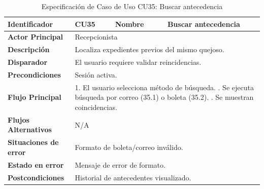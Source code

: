 \begingroup
\setlength{\parskip}{0pt}
\begin{longtable}{|p{3.5cm}|p{2cm}|p{2.5cm}|p{7cm}|}
\caption{Especificación de Caso de Uso CU35: Buscar antecedencia}
\label{tab:cu35} \\
\hline
\textbf{Identificador} & CU35 & \textbf{Nombre} & Buscar antecedencia \\ \hline
\textbf{Actor Principal} & \multicolumn{3}{p{11.5cm}|}{Recepcionista} \\ \hline
\textbf{Descripción} & \multicolumn{3}{p{11.5cm}|}{Localiza expedientes previos del mismo quejoso.} \\ \hline
\textbf{Disparador} & \multicolumn{3}{p{11.5cm}|}{El usuario requiere validar reincidencias.} \\ \hline
\textbf{Precondiciones} & \multicolumn{3}{p{11.5cm}|}{Sesión activa.} \\ \hline
\textbf{Flujo Principal} & \multicolumn{3}{p{11.5cm}|}{1. El usuario selecciona método de búsqueda. \newline 2. Se ejecuta búsqueda por correo (35.1) o boleta (35.2). \newline 3. Se muestran coincidencias.} \\ \hline
\textbf{Flujos Alternativos} & \multicolumn{3}{p{11.5cm}|}{N/A} \\ \hline
\textbf{Situaciones de error} & \multicolumn{3}{p{11.5cm}|}{Formato de boleta/correo inválido.} \\ \hline
\textbf{Estado en error} & \multicolumn{3}{p{11.5cm}|}{Mensaje de error de formato.} \\ \hline
\textbf{Postcondiciones} & \multicolumn{3}{p{11.5cm}|}{Historial de antecedentes visualizado.} \\ \hline
\end{longtable}
\endgroup

\vspace{0.8cm}

